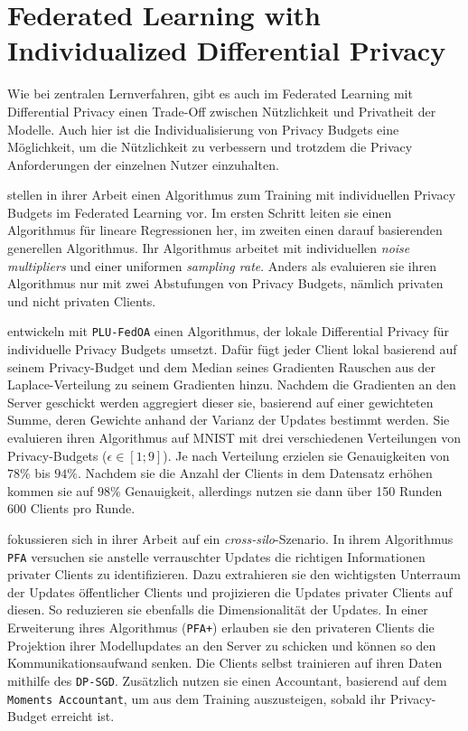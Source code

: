 \section{Federated Learning with Individualized Differential Privacy}\label{sec:rw-flidp}

Wie bei zentralen Lernverfahren, gibt es auch im Federated Learning mit Differential Privacy einen Trade-Off zwischen Nützlichkeit und Privatheit der Modelle. Auch hier ist die Individualisierung von Privacy Budgets eine Möglichkeit, um die Nützlichkeit zu verbessern und trotzdem die Privacy Anforderungen der einzelnen Nutzer einzuhalten.

\textcite{aldaghri:2023} stellen in ihrer Arbeit einen Algorithmus zum Training mit individuellen Privacy Budgets im Federated Learning vor. Im ersten Schritt leiten sie einen Algorithmus für lineare Regressionen her, im zweiten einen darauf basierenden generellen Algorithmus. Ihr Algorithmus arbeitet mit individuellen \textit{noise multipliers} und einer uniformen \textit{sampling rate}. Anders als \citeauthor{boenisch:2023} evaluieren sie ihren Algorithmus nur mit zwei Abstufungen von Privacy Budgets, nämlich privaten und nicht privaten Clients.

\textcite{yang:2021} entwickeln mit \texttt{PLU-FedOA} einen Algorithmus, der lokale Differential Privacy für individuelle Privacy Budgets umsetzt. Dafür fügt jeder Client lokal basierend auf seinem Privacy-Budget und dem Median seines Gradienten Rauschen aus der Laplace-Verteilung zu seinem Gradienten hinzu. Nachdem die Gradienten an den Server geschickt werden aggregiert dieser sie, basierend auf einer gewichteten Summe, deren Gewichte anhand der Varianz der Updates bestimmt werden. Sie evaluieren ihren Algorithmus auf MNIST mit drei verschiedenen Verteilungen von Privacy-Budgets ($\epsilon \in [1;9]$). Je nach Verteilung erzielen sie Genauigkeiten von $78\%$ bis $94\%$. Nachdem sie die Anzahl der Clients in dem Datensatz erhöhen kommen sie auf $98\%$ Genauigkeit, allerdings nutzen sie dann über 150 Runden 600 Clients pro Runde.

\textcite{liu:2021} fokussieren sich in ihrer Arbeit auf ein \textit{cross-silo}-Szenario. In ihrem Algorithmus \texttt{PFA} versuchen sie anstelle verrauschter Updates die \glqq{}richtigen\grqq{} Informationen privater Clients zu identifizieren. Dazu extrahieren sie den wichtigsten Unterraum der Updates öffentlicher Clients und projizieren die Updates privater Clients auf diesen. So reduzieren sie ebenfalls die Dimensionalität der Updates. In einer Erweiterung ihres Algorithmus (\texttt{PFA+}) erlauben sie den privateren Clients die Projektion ihrer Modellupdates an den Server zu schicken und können so den Kommunikationsaufwand senken. Die Clients selbst trainieren auf ihren Daten mithilfe des \texttt{DP-SGD}\cite{abadi:2016}. Zusätzlich nutzen sie einen Accountant, basierend auf dem \texttt{Moments Accountant}, um aus dem Training auszusteigen, sobald ihr Privacy-Budget erreicht ist.

